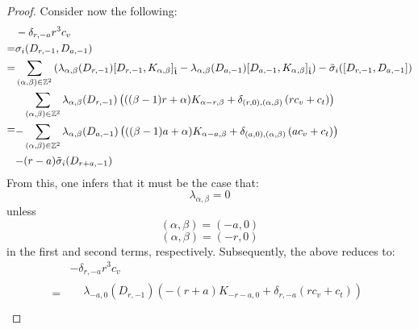 \begin{proof}
                Consider now the following:
                    $$
                        \begin{aligned}
                            & -\delta_{r, -a} r^3 c_v
                            \\
                            = & \sigma_i(D_{r, -1}, D_{a, -1})
                            \\
                            = & \sum_{(\alpha, \beta) \in \Z^2} \left( \lambda_{\alpha, \beta}(D_{r, -1}) [D_{r, -1}, K_{\alpha, \beta}]_{\extendedtoroidal} - \lambda_{\alpha, \beta}(D_{a, -1}) [D_{a, -1}, K_{\alpha, \beta}]_{\extendedtoroidal} \right) - \tilde{\sigma}_i( [D_{r, -1}, D_{a, -1}] )
                            \\
                            = &
                            \begin{aligned}
                                & \sum_{(\alpha, \beta) \in \Z^2} \lambda_{\alpha, \beta}(D_{r, -1}) \left( ((\beta - 1)r + \alpha) K_{\alpha - r, \beta} + \delta_{(r, 0), (\alpha, \beta)} \left( r c_v + c_t \right) \right)
                                \\
                                - & \sum_{(\alpha, \beta) \in \Z^2} \lambda_{\alpha, \beta}(D_{a, -1}) \left( ((\beta - 1)a + \alpha) K_{\alpha - a, \beta} + \delta_{(a, 0), (\alpha, \beta)} \left( a c_v + c_t \right) \right)
                                \\
                                - & (r - a) \tilde{\sigma}_i( D_{r + a, -1} )
                            \end{aligned}
                        \end{aligned}
                    $$
                From this, one infers that it must be the case that:
                    $$\lambda_{\alpha, \beta} = 0$$
                unless
                    $$(\alpha, \beta) = (-a, 0)$$
                    $$(\alpha, \beta) = (-r, 0)$$
                in the first and second terms, respectively. Subsequently, the above reduces to:
                    $$
                        \begin{aligned}
                            & -\delta_{r, -a} r^3 c_v
                            \\
                            = & 
                            \begin{aligned}
                                & \lambda_{-a, 0}(D_{r, -1}) \left( -(r + a) K_{-r - a, 0} + \delta_{r, -a} \left( r c_v + c_t \right) \right)
                                \\

\end{aligned}
\end{aligned}$$
\end{proof}
